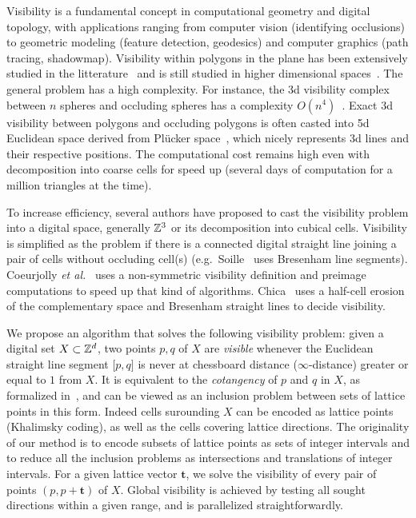 \documentclass[runningheads]{llncs}
\begin{document}
    Visibility is a fundamental concept in computational geometry and
    digital topology, with applications ranging from computer vision
    (identifying occlusions) to geometric modeling (feature detection, geodesics)
    and computer graphics (path tracing, shadowmap). Visibility within
    polygons in the plane has been extensively studied in the
    litterature~\cite{ghosh:2007-book} and is still studied in higher
    dimensional spaces~\cite{orourke:2017-book}. The general problem
    has a high complexity. For instance, the 3d visibility complex
    between $n$ spheres and occluding spheres has a complexity
    $O(n^4)$~\cite{durand:2002-tog}. Exact 3d visibility between
    polygons and occluding polygons is often casted into 5d Euclidean
    space derived from Plücker space~\cite{nirenstein:2002-ewr}, which
    nicely represents 3d lines and their respective positions. The
    computational cost remains high even with decomposition into
    coarse cells for speed up (several days of computation for a
    million triangles at the time).

    To increase efficiency, several authors have proposed to cast the
    visibility problem into a digital space, generally $\mathbb{Z}^3$ or its
    decomposition into cubical cells. Visibility is simplified as the
    problem if there is a connected digital straight line joining a
    pair of cells without occluding cell(s) (e.g.\ Soille~\cite{soille:1994-prl}
    uses Bresenham line segments). Coeurjolly \emph{et al.}~\cite{coeurjolly:2004-prl}
    uses a non-symmetric visibility definition and preimage computations
    to speed up that kind of algorithms. Chica~\cite{chica:2008-spm}
    uses a half-cell erosion of the complementary space and Bresenham
    straight lines to decide visibility.

    We propose an algorithm that solves the following visibility
    problem: given a digital set $X \subset \mathbb{Z}^d$, two points $p,q$ of
    $X$ are \emph{visible} whenever the Euclidean straight line
    segment $\lbrack p,q \rbrack$ is never at chessboard distance
    ($\infty$-distance) greater or equal to $1$ from $X$. It is
    equivalent to the \emph{cotangency} of $p$ and $q$ in $X$, as
    formalized in~\cite{lachaud:2021-dgmm,lachaud:2022-jmiv}, and can
    be viewed as an inclusion problem between sets of lattice points
    in this form. Indeed cells surounding $X$ can be encoded as
    lattice points (Khalimsky coding), as well as the cells covering
    lattice directions. The originality of our method is to encode
    subsets of lattice points as sets of integer intervals and to
    reduce all the inclusion problems as intersections and
    translations of integer intervals. For a given lattice vector
    $\mathbf{t}$, we solve the visibility of every pair of points
    $(p,p+\mathbf{t})$ of $X$. Global visibility is achieved by
    testing all sought directions within a given range, and is
    parallelized straightforwardly.
\end{document}
